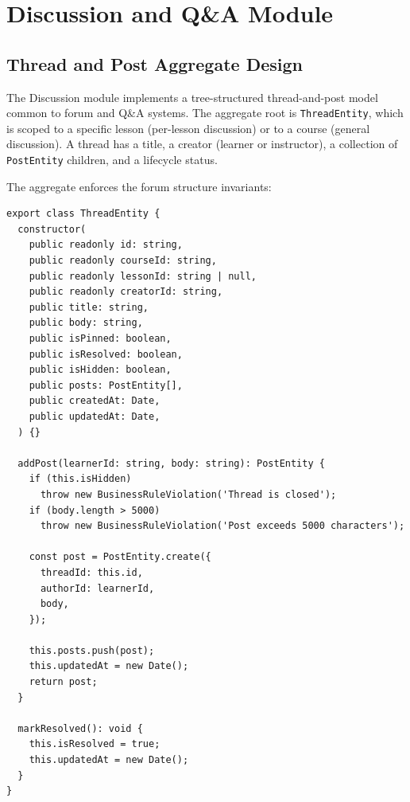 
\section{Discussion and Q\&A Module}
\label{sec:discussion-module}

\subsection{Thread and Post Aggregate Design}

The Discussion module implements a tree-structured thread-and-post model common to forum and Q\&A systems. The aggregate root is \texttt{ThreadEntity}, which is scoped to a specific lesson (per-lesson discussion) or to a course (general discussion). A thread has a title, a creator (learner or instructor), a collection of \texttt{PostEntity} children, and a lifecycle status.

The aggregate enforces the forum structure invariants:

\begin{lstlisting}[caption=Discussion Thread Aggregate,label=lst:thread-aggregate]
export class ThreadEntity {
  constructor(
    public readonly id: string,
    public readonly courseId: string,
    public readonly lessonId: string | null,
    public readonly creatorId: string,
    public title: string,
    public body: string,
    public isPinned: boolean,
    public isResolved: boolean,
    public isHidden: boolean,
    public posts: PostEntity[],
    public createdAt: Date,
    public updatedAt: Date,
  ) {}

  addPost(learnerId: string, body: string): PostEntity {
    if (this.isHidden)
      throw new BusinessRuleViolation('Thread is closed');
    if (body.length > 5000)
      throw new BusinessRuleViolation('Post exceeds 5000 characters');

    const post = PostEntity.create({
      threadId: this.id,
      authorId: learnerId,
      body,
    });

    this.posts.push(post);
    this.updatedAt = new Date();
    return post;
  }

  markResolved(): void {
    this.isResolved = true;
    this.updatedAt = new Date();
  }
}
\end{lstlisting}

